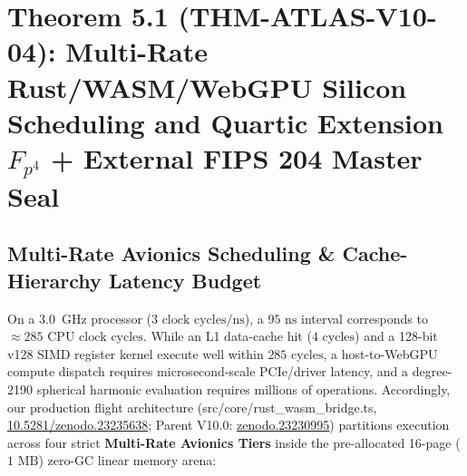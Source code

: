 \documentclass[11pt,a4paper,reqno]{article}
\def\texttt#1{#1}%
\def\mathbb#1{#1}%
\newcommand{\zenodo}[1]{\href{https://doi.org/10.5281/zenodo.#1}{\texttt{10.5281/\allowbreak zenodo.#1}}}
\newcommand{\zenodoshort}[1]{\href{https://doi.org/10.5281/zenodo.#1}{\texttt{zenodo.#1}}}
\theoremstyle{plain}
\theoremstyle{definition}
\theoremstyle{remark}
\numberwithin{equation}{section}
\begin{document}
\section{\texorpdfstring{Theorem 5.1 (\texttt{THM-ATLAS-V10-04}): Multi-Rate Rust/WASM/WebGPU Silicon Scheduling and Quartic Extension $\mathbb{F}_{p^4}$ + External FIPS 204 Master Seal}{Theorem 5.1 (THM-ATLAS-V10-04): Multi-Rate Rust/WASM/WebGPU Silicon Scheduling and Quartic Extension F\_\{p\^4\} + External FIPS 204 Master Seal}}

\subsection{Multi-Rate Avionics Scheduling \& Cache-Hierarchy Latency Budget}
On a 3.0~GHz processor ($3\text{ clock cycles/ns}$), a $95\text{ ns}$ interval corresponds to $\approx 285\text{ CPU clock cycles}$. While an L1 data-cache hit ($4\text{ cycles}$) and a 128-bit \texttt{v128} SIMD register kernel execute well within $285\text{ cycles}$, a host-to-WebGPU compute dispatch requires microsecond-scale PCIe/driver latency, and a degree-2190 spherical harmonic evaluation requires millions of operations. Accordingly, our production flight architecture (\texttt{src/core/rust\_wasm\_bridge.ts}, \zenodo{23235638}; Parent V10.0: \zenodoshort{23230995}) partitions execution across four strict \textbf{Multi-Rate Avionics Tiers} inside the pre-allocated 16-page ($1\text{ MB}$) zero-GC linear memory arena:
\end{document}

